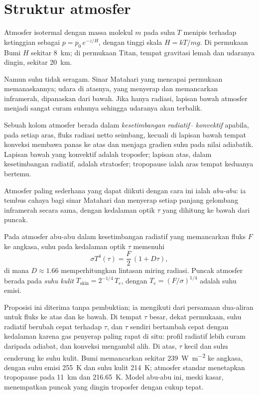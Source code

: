 \section{Struktur atmosfer}\label{sec:b3:planetary-atmospheres:structure}

Atmosfer isotermal dengan massa molekul $m$ pada suhu $T$ menipis
terhadap ketinggian sebagai $p = p_0\,e^{-z/H}$, dengan tinggi skala $H = kT/mg$.
Di permukaan Bumi $H$ sekitar \qty{8}{km}; di permukaan
Titan, tempat gravitasi lemah dan udaranya dingin, sekitar \qty{20}{km}.

Namun suhu tidak seragam. Sinar Matahari yang mencapai permukaan
memanaskannya; udara di atasnya, yang menyerap dan memancarkan inframerah,
dipanaskan dari bawah. Jika hanya radiasi, lapisan bawah atmosfer
menjadi sangat curam suhunya sehingga udaranya akan terbalik.

\begin{definition}\label{def:b3:planetary-atmospheres:rce}
Sebuah kolom atmosfer berada dalam \emph{kesetimbangan radiatif--
konvektif} apabila, pada setiap
aras, fluks radiasi netto seimbang, kecuali di lapisan bawah
tempat konveksi membawa panas ke atas dan menjaga gradien suhu pada
nilai adiabatik. Lapisan bawah yang konvektif adalah troposfer; lapisan
atas, dalam kesetimbangan radiatif, adalah stratosfer; tropopause
ialah aras tempat keduanya bertemu.
\end{definition}

Atmosfer paling sederhana yang dapat diikuti dengan cara ini ialah \emph{abu-abu}: ia
tembus cahaya bagi sinar Matahari dan menyerap setiap panjang gelombang inframerah secara sama,
dengan kedalaman optik $\tau$ yang dihitung ke bawah dari puncak.

\begin{proposition}\label{prop:b3:planetary-atmospheres:grey}
Pada atmosfer abu-abu dalam kesetimbangan radiatif yang memancarkan fluks $F$ ke
angkasa, suhu pada kedalaman optik $\tau$ memenuhi
\[
\sigma T^4(\tau) = \frac F2\,(1 + D\tau),
\]
di mana $D \approx 1.66$ memperhitungkan lintasan miring radiasi.
Puncak atmosfer berada pada \emph{suhu kulit}
$T_\mathrm{skin} = 2^{-1/4}\,T_e$, dengan $T_e = (F/\sigma)^{1/4}$ adalah
suhu emisi.
\end{proposition}

Proposisi ini diterima tanpa pembuktian; ia mengikuti dari persamaan dua-aliran untuk
fluks ke atas dan ke bawah. Di tempat $\tau$ besar, dekat permukaan,
suhu radiatif berubah cepat terhadap $\tau$, dan $\tau$ sendiri
bertambah cepat dengan kedalaman karena gas penyerap paling rapat di situ: profil
radiatif lebih curam daripada adiabat, dan konveksi mengambil alih.
Di atas, $\tau$ kecil dan suhu cenderung ke
suhu kulit. Bumi memancarkan sekitar \qty{239}{W.m^{-2}} ke angkasa, dengan
suhu emisi \qty{255}{K} dan suhu kulit
\qty{214}{K}; atmosfer standar menetapkan tropopause pada \qty{11}{km}
dan \qty{216.65}{K}. Model abu-abu ini, meski kasar, menempatkan puncak yang dingin
troposfer dengan cukup tepat.

